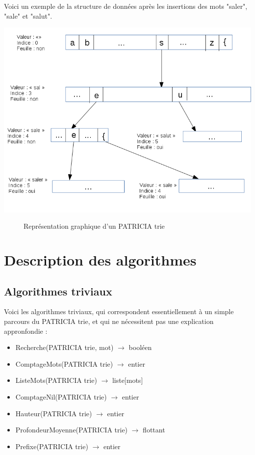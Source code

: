 \documentclass[a4paper,12pt]{report}
\begin{document}
Voici un exemple de la structure de données après les insertions des mots "saler", "sale" et "salut".

\begin{center}
\includegraphics[scale=0.40]{../rapport/Schema_PAT_trie.png}
\end{center}
\begin{figure}
\caption{Représentation graphique d'un PATRICIA trie}
\end{figure}



\section{Description des algorithmes}
\subsection{Algorithmes triviaux}
Voici les algorithmes triviaux, qui correspondent essentiellement à un simple parcours du PATRICIA trie, et qui ne nécessitent pas une explication appronfondie :
\begin{itemize}
 \item Recherche(PATRICIA trie, mot) $\rightarrow$ booléen
 \item ComptageMots(PATRICIA trie) $\rightarrow$ entier
 \item ListeMots(PATRICIA trie) $\rightarrow$ liste[mots]
 \item ComptageNil(PATRICIA trie) $\rightarrow$ entier
 \item Hauteur(PATRICIA trie) $\rightarrow$ entier
 \item ProfondeurMoyenne(PATRICIA trie) $\rightarrow$ flottant
 \item Prefixe(PATRICIA trie) $\rightarrow$ entier
\end{itemize}
\end{document}
